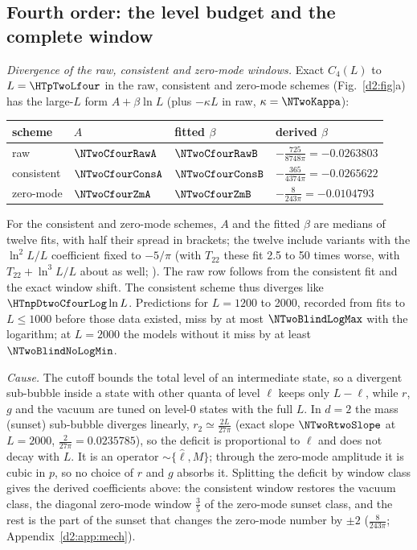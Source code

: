 \subsection{Fourth order: the level budget and the complete window}\label{d2:c4}
\emph{Divergence of the raw, consistent and zero-mode windows.} Exact $C_4(L)$ to $L=\HTpTwoLfour$ in the raw, consistent and zero-mode schemes
(Fig.~\ref{d2:fig}a) has the large-$L$ form $A+\beta\ln L$ (plus $-\kappa L$ in raw, $\kappa=\NTwoKappa$):
\begin{center}\small
\begin{tabular}{@{}llll@{}}
\toprule
scheme & $A$ & fitted $\beta$ & derived $\beta$ \\\midrule
raw & $\NTwoCfourRawA$ & $\NTwoCfourRawB$ & $-\frac{725}{8748\pi}=-0.0263803$ \\
consistent & $\NTwoCfourConsA$ & $\NTwoCfourConsB$ & $-\frac{365}{4374\pi}=-0.0265622$ \\
zero-mode & $\NTwoCfourZmA$ & $\NTwoCfourZmB$ & $-\frac{8}{243\pi}=-0.0104793$ \\
\bottomrule
\end{tabular}
\end{center}
For the consistent and zero-mode schemes, $A$ and the fitted $\beta$ are medians of twelve fits, with half their spread in
brackets; the twelve include variants with the $\ln^2L/L$ coefficient fixed to $-5/\pi$ (with $T_{22}$ these fit 2.5 to 50 times
worse, with $T_{22}+\ln^3L/L$ about as well; ). The raw row follows from the consistent fit and the exact window shift.
The consistent scheme thus diverges like $\HTnpDtwoCfourLog\ln L$. Predictions for $L=1200$ to 2000, recorded from fits to
$L\le1000$ before those data existed, miss by at most $\NTwoBlindLogMax$ with the logarithm; at $L=2000$ the models
without it miss by at least $\NTwoBlindNoLogMin$.

\emph{Cause.} The cutoff bounds the total level of an intermediate state, so a divergent sub-bubble inside a state with other
quanta of level $\ell$ keeps only $L-\ell$, while $r$, $g$ and the vacuum are tuned on level-0 states with the full $L$. In
$d=2$ the mass (sunset) sub-bubble diverges linearly, $r_2\simeq\frac{2L}{27\pi}$ (exact slope $\NTwoRtwoSlope$ at $L=2000$,
$\frac2{27\pi}=0.0235785$), so the deficit is proportional to $\ell$ and does not decay with $L$. It is an operator
${\sim}\{\hat\ell,M\}$; through the zero-mode amplitude it is cubic in $p$, so no choice of $r$ and $g$ absorbs it. Splitting the
deficit by window class gives the derived coefficients above: the consistent window restores the vacuum class, the diagonal
zero-mode window $\frac35$ of the zero-mode sunset class, and the rest is the part of the sunset that changes the
zero-mode number by $\pm2$ ($\frac8{243\pi}$; Appendix~\ref{d2:app:mech}).

